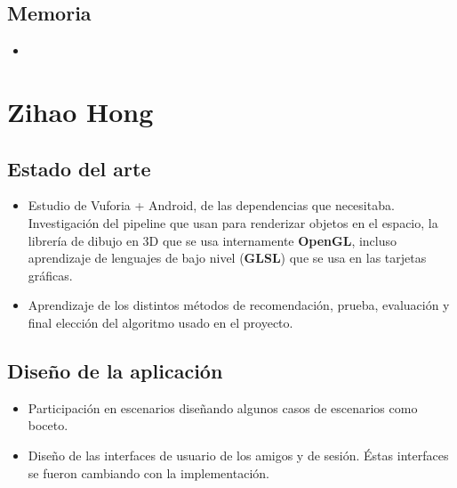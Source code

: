     \subsection{Memoria}
    \label{makereference7.3.3}
        \begin{itemize}
            \item
        \end{itemize}

\section{Zihao Hong}
\label{makereference7.4}
    \subsection{Estado del arte}
    \label{makereference7.4.1}
        \begin{itemize}
            \item Estudio de Vuforia + Android, de las dependencias que necesitaba. Investigación del pipeline 
            que usan para renderizar objetos en el espacio, la librería de dibujo en 3D que se usa internamente \textbf{OpenGL}, 
            incluso aprendizaje de lenguajes de bajo nivel (\textbf{GLSL}) que se usa en las tarjetas gráficas.
            \item Aprendizaje de los distintos métodos de recomendación, prueba, evaluación y final elección del algoritmo usado en el proyecto.  
        \end{itemize}
    \subsection{Diseño de la aplicación}
    \label{makereference7.4.2}
        \begin{itemize}
            \item Participación en escenarios diseñando algunos casos de escenarios como boceto.
            \item Diseño de las interfaces de usuario de los amigos y de sesión. Éstas interfaces se fueron cambiando con la implementación.
        \end{itemize}
